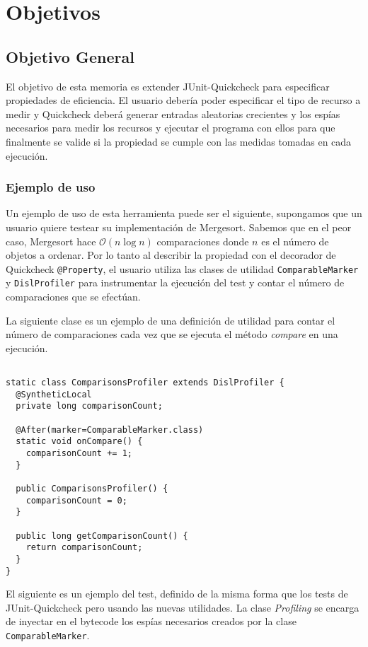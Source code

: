 \section{Objetivos}\label{chap:obj}

\subsection*{Objetivo General}\label{sec:obj-g}
El objetivo de esta memoria es extender JUnit-Quickcheck para especificar
propiedades de eficiencia. El usuario debería poder especificar el tipo de
recurso a medir y Quickcheck deberá generar entradas aleatorias crecientes y
los espías necesarios para medir los recursos y ejecutar el programa con ellos
para que finalmente se valide si la propiedad se cumple con las medidas tomadas
en cada ejecución.

\subsubsection*{Ejemplo de uso}
Un ejemplo de uso de esta herramienta puede ser el siguiente, supongamos que un
usuario quiere testear su implementación de Mergesort. Sabemos que en el peor
caso, Mergesort hace $\mathcal{O}(n\log{n})$ comparaciones donde $n$ es el número
de objetos a ordenar.
Por lo tanto al describir la propiedad con el decorador de Quickcheck
\texttt{@Property}, el usuario utiliza las clases de utilidad
\texttt{ComparableMarker} y \texttt{DislProfiler} para instrumentar la ejecución
del test y contar el número de comparaciones que se efectúan.

La siguiente clase es un ejemplo de una definición de utilidad para contar el
número de comparaciones cada vez que se ejecuta el método \textit{compare} en una
ejecución.

\begin{verbatim}

static class ComparisonsProfiler extends DislProfiler {
  @SyntheticLocal
  private long comparisonCount;

  @After(marker=ComparableMarker.class)
  static void onCompare() {
    comparisonCount += 1;
  }

  public ComparisonsProfiler() {
    comparisonCount = 0;
  }

  public long getComparisonCount() {
    return comparisonCount;
  }
}
\end{verbatim}

El siguiente es un ejemplo del test, definido de la misma forma que los tests
de JUnit-Quickcheck pero usando las nuevas utilidades.
La clase \textit{Profiling} se encarga de inyectar en el bytecode los espías
necesarios creados por la clase \texttt{ComparableMarker}.


